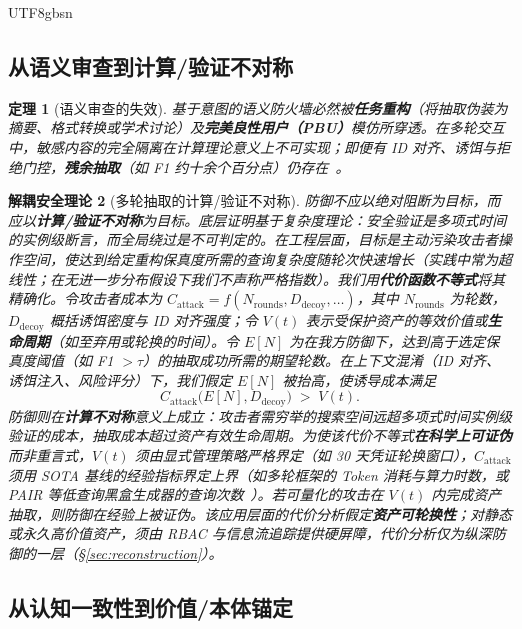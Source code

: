 \documentclass[letterpaper,twocolumn,10pt]{article}
\newtheorem{theorem}{定理}[section]
\newtheorem{definition}[theorem]{解耦安全理论}
\begin{document}
\begin{CJK}{UTF8}{gbsn}
\subsection{从语义审查到计算/验证不对称}
\label{sec:paradigm-economics}

\begin{theorem}[语义审查的失效]
基于意图的语义防火墙\emph{必然}被\textbf{任务重构}（将抽取伪装为摘要、格式转换或学术讨论）及\textbf{完美良性用户（PBU）}模仿所穿透。在多轮交互中，敏感内容的完全隔离在计算理论意义上不可实现；即便有 ID 对齐、诱饵与拒绝门控，\textbf{残余抽取}（如 F1 约十余个百分点）仍存在~\cite{subgraph-rag-attack,pbu-reconstruct}。
\end{theorem}

\begin{definition}[多轮抽取的计算/验证不对称]
防御不应以绝对阻断为目标，而应以\textbf{计算/验证不对称}为目标。底层证明基于复杂度理论：安全验证是多项式时间的实例级断言，而全局绕过是不可判定的。在工程层面，目标是\emph{主动污染攻击者操作空间}，使达到给定重构保真度所需的\emph{查询复杂度}随轮次快速增长（实践中常为超线性；在无进一步分布假设下我们不声称严格指数）。我们用\textbf{代价函数不等式}将其精确化。令攻击者成本为 $C_{\mathrm{attack}} = f(N_{\mathrm{rounds}}, D_{\mathrm{decoy}}, \ldots)$，其中 $N_{\mathrm{rounds}}$ 为轮数，$D_{\mathrm{decoy}}$ 概括诱饵密度与 ID 对齐强度；令 $V(t)$ 表示受保护资产的等效价值或\textbf{生命周期}（如至弃用或轮换的时间）。令 $E[N]$ 为在我方防御下，达到高于选定保真度阈值（如 F1 $> \tau$）的抽取成功所需的\emph{期望轮数}。在上下文混淆（ID 对齐、诱饵注入、风险评分）下，我们假定 $E[N]$ 被\emph{抬高}，使诱导成本满足
\begin{equation}
C_{\mathrm{attack}}\bigl(E[N], D_{\mathrm{decoy}}\bigr) \;>\; V(t).
\end{equation}
防御则在\textbf{计算不对称}意义上成立：攻击者需穷举的搜索空间远超多项式时间实例级验证的成本，抽取成本超过资产有效生命周期。为使该代价不等式\textbf{在科学上可证伪}而非重言式，$V(t)$ 须由显式管理策略严格界定（如 30 天凭证轮换窗口），$C_{\mathrm{attack}}$ 须用 SOTA 基线的经验指标界定上界（如多轮框架的 Token 消耗与算力时数，或 PAIR 等低查询黑盒生成器的查询次数~\cite{pair-jailbreak}）。若可量化的攻击在 $V(t)$ 内完成资产抽取，则防御在经验上被证伪。该应用层面的代价分析假定\textbf{资产可轮换性}；对静态或永久高价值资产，须由 RBAC 与信息流追踪提供硬屏障，代价分析仅为纵深防御的一层（\S\ref{sec:reconstruction}）。
\end{definition}

\subsection{从认知一致性到价值/本体锚定}
\label{sec:paradigm-axiological}


\end{CJK}
\end{document}
